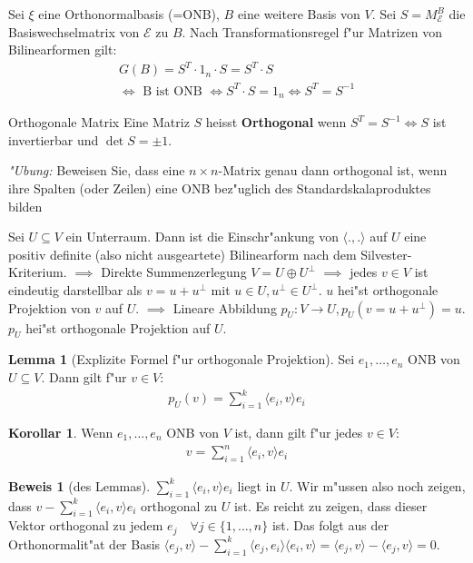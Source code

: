 \documentclass[oneside,fontsize=11pt,paper=a4,BCOR=0mm,DIV=12,automark,headsepline]{scrbook}
\theoremstyle{remark}
\theoremstyle{definition}
\newtheorem{lemma}{Lemma}[section]
\newtheorem*{korollar}{Korollar}
\theoremstyle{definition}
\newtheorem*{prof}{Beweis}
\theoremstyle{remark}
\begin{document}
\begin{relation}
  Sei $\xi$ eine Orthonormalbasis (=ONB), $B$ eine weitere Basis von $V$. Sei
  $S=M^B_\mathcal{E}$ die Basiswechselmatrix von $\mathcal{E}$ zu $B$. Nach
  Transformationsregel f"ur Matrizen von Bilinearformen gilt:
  \begin{align*}
    G(B) =  S^T\cdot 1_n \cdot S = S^T\cdot S\\
    \iff \text{ B ist ONB } \iff S^T\cdot S = 1_n \iff S^T = S^{-1}
  \end{align*}
\end{relation}

\begin{definition}{Orthogonale Matrix}
  Eine Matriz $S$ heisst \textbf{Orthogonal} wenn $S^T=S^{-1} \iff S$  ist
  invertierbar und $\det S = \pm 1$.
\end{definition}


  \emph{"Ubung:} Beweisen Sie, dass eine \(n\times n\)-Matrix genau dann orthogonal ist, wenn ihre Spalten (oder Zeilen) eine ONB bez"uglich des Standardskalaproduktes bilden

  Sei \(U\subseteq V\) ein Unterraum. Dann ist die Einschr"ankung von \(\langle ., .\rangle\) auf \(U\) eine positiv definite (also nicht ausgeartete) Bilinearform nach dem Silvester-Kriterium. \(\implies\) Direkte Summenzerlegung \(V = U\oplus U^\perp\) \(\implies\) jedes \(v\in V\) ist eindeutig darstellbar als \(v = u + u^\perp\) mit \(u\in U, u^\perp \in U^\perp\). \(u\) hei"st orthogonale Projektion von \(v\) auf \(U\). \(\implies\) Lineare Abbildung \(p_U: V\to U, p_U(v = u + u^\perp) = u\). \(p_U\) hei"st orthogonale Projektion auf \(U\).

\begin{lemma}[Explizite Formel f"ur orthogonale Projektion]
  Sei \(e_1, \dots, e_n\) ONB von \(U \subseteq V\). Dann gilt f"ur \(v\in V\):
  \begin{align*}
    p_U(v) = \sum_{i=1}^k\langle e_i, v\rangle e_i
  \end{align*}
\end{lemma}
\begin{korollar}
  Wenn \(e_1,\dots, e_n\) ONB von \(V\) ist, dann gilt f"ur jedes \(v \in V\):
  \begin{align*}
    v = \sum_{i=1}^n\langle e_i, v\rangle e_i
  \end{align*}
\end{korollar}
\begin{prof}[des Lemmas]
  \(\sum_{i=1}^k \langle e_i, v\rangle e_i\) liegt in \(U\). Wir m"ussen also noch zeigen, dass \(v - \sum_{i=1}^k\langle e_i, v\rangle e_i\) orthogonal zu \(U\) ist. Es reicht zu zeigen, dass dieser Vektor orthogonal zu jedem \(e_j \quad\forall j \in \{1,\dots, n\}\) ist. Das folgt aus der Orthonormalit"at der Basis \(\langle e_j, v\rangle - \sum_{i=1}^k \langle e_j, e_i\rangle\langle e_i, v\rangle = \langle e_j, v\rangle - \langle e_j, v\rangle = 0\).
\end{prof}
\end{document}
